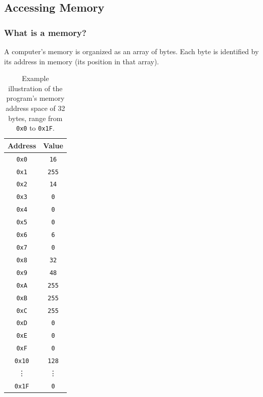 \subsection{Accessing Memory}\label{subsection: Accessing Memory}

\subsubsection{What is a memory?}

A computer's memory is organized as an array of bytes. Each byte is identified by its address in memory (its position in that array).
\begin{table}[!htp]
    \centering
    \begin{tabular}{@{} c | c @{}}
        \toprule
        Address & Value \\
        \midrule
        \texttt{0x0} & \texttt{16} \\
        \texttt{0x1} & \texttt{255} \\
        \texttt{0x2} & \texttt{14} \\
        \texttt{0x3} & \texttt{0} \\
        \texttt{0x4} & \texttt{0} \\
        \texttt{0x5} & \texttt{0} \\
        \texttt{0x6} & \texttt{6} \\
        \texttt{0x7} & \texttt{0} \\
        \texttt{0x8} & \texttt{32} \\
        \texttt{0x9} & \texttt{48} \\
        \texttt{0xA} & \texttt{255} \\
        \texttt{0xB} & \texttt{255} \\
        \texttt{0xC} & \texttt{255} \\
        \texttt{0xD} & \texttt{0} \\
        \texttt{0xE} & \texttt{0} \\
        \texttt{0xF} & \texttt{0} \\
        \texttt{0x10} & \texttt{128} \\
        \vdots & \vdots \\
        \texttt{0x1F} & \texttt{0} \\
        \bottomrule
    \end{tabular}
    \caption{Example illustration of the program's memory address space of 32 bytes, range from \texttt{0x0} to \texttt{0x1F}.}
\end{table}

